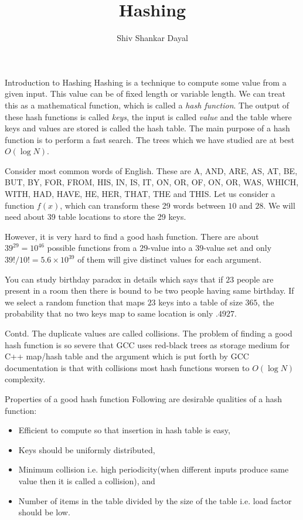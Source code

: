 \documentclass[aspectratio=169,8pt]{beamer}
\title{Hashing}
\author[Shiv Shankar Dayal]{Shiv Shankar Dayal}
\begin{document}
\begin{frame}
  \titlepage
\end{frame}
\begin{frame}{Introduction to Hashing}
  Hashing is a technique to compute some value from a given input. This value can be of fixed length or
  variable length. We can treat this as a mathematical function, which is called a {\it hash function}. The
  output of these hash functions is called {\it keys}, the input is called {\it value} and the table where
  keys and values are stored is called the hash table. The main purpose of a hash function is to perform a
  fast search. The trees which we have studied are at best $O(\log N)$.

  Consider most common words of English. These are A, AND, ARE, AS, AT, BE, BUT, BY, FOR, FROM,  HIS, IN,
  IS, IT, ON, OR, OF, ON, OR, WAS, WHICH, WITH, HAD, HAVE, HE, HER, THAT, THE and THIS. Let us consider a
  function $f(x)$, which can transform these 29 words between $10$ and $28$. We will need about 39 table
  locations to store the 29 keys.

  However, it is very hard to find a good hash function. There are about $39^{29}=10^{46}$ possible
  functions from a $29$-value into a $39$-value set and only $39!/10!=5.6\times10^{39}$ of them will give
  distinct values for each argument.

  You can study birthday paradox in details which says that if $23$ people are present in a room then there
  is bound to be two people having same birthday. If we select a random function that maps $23$ keys into a
  table of size $365$, the probability that no two keys map to same location is only $.4927$.
\end{frame}
\begin{frame}{Contd.}
  The duplicate values are called collisions. The problem of finding a good hash function is so severe that
  GCC uses red-black trees as storage medium for C++ map/hash table and the argument which is put forth by
  GCC documentation is that with collisions most hash functions worsen to $O(\log N)$ complexity.
\end{frame}
\begin{frame}{Properties of a good hash function}
  Following are desirable qualities of a hash function:
  \begin{itemize}
  \item Efficient to compute so that insertion in hash table is easy,
  \item Keys should be uniformly distributed,
  \item Minimum collision i.e. high periodicity(when different inputs produce same value then it is called a
    collision), and
  \item Number of items in the table divided by the size of the table i.e. load factor should be low.
  \end{itemize}
\end{frame}
\end{document}
